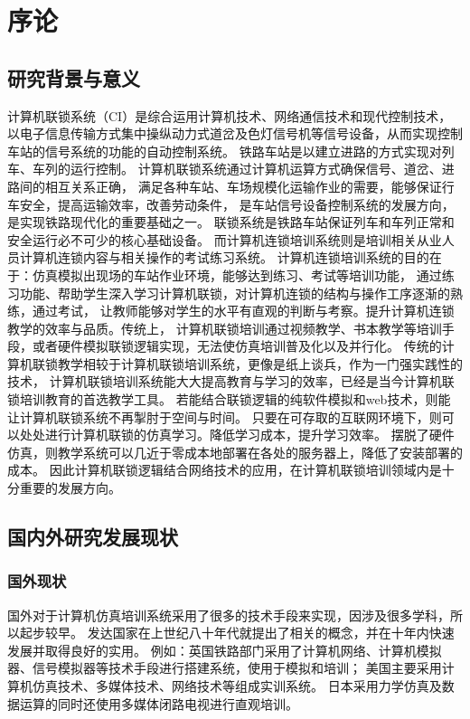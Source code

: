 \section{序论}
\subsection{研究背景与意义}
计算机联锁系统（CI）是综合运用计算机技术、网络通信技术和现代控制技术，
以电子信息传输方式集中操纵动力式道岔及色灯信号机等信号设备，从而实现控制车站的信号系统的功能的自动控制系统。
铁路车站是以建立进路的方式实现对列车、车列的运行控制。
计算机联锁系统通过计算机运算方式确保信号、道岔、进路间的相互关系正确，
满足各种车站、车场规模化运输作业的需要，能够保证行车安全，提高运输效率，改善劳动条件，
是车站信号设备控制系统的发展方向，是实现铁路现代化的重要基础之一。
联锁系统是铁路车站保证列车和车列正常和安全运行必不可少的核心基础设备。
而计算机连锁培训系统则是培训相关从业人员计算机连锁内容与相关操作的考试练习系统。
计算机连锁培训系统的目的在于：仿真模拟出现场的车站作业环境，能够达到练习、考试等培训功能，
通过练习功能、帮助学生深入学习计算机联锁，对计算机连锁的结构与操作工序逐渐的熟练，通过考试，
让教师能够对学生的水平有直观的判断与考察。提升计算机连锁教学的效率与品质。传统上，
计算机联锁培训通过视频教学、书本教学等培训手段，或者硬件模拟联锁逻辑实现，无法使仿真培训普及化以及并行化。
传统的计算机联锁教学相较于计算机联锁培训系统，更像是纸上谈兵，作为一门强实践性的技术，
计算机联锁培训系统能大大提高教育与学习的效率，已经是当今计算机联锁培训教育的首选教学工具。
若能结合联锁逻辑的纯软件模拟和web技术，则能让计算机联锁系统不再掣肘于空间与时间。
只要在可存取的互联网环境下，则可以处处进行计算机联锁的仿真学习。降低学习成本，提升学习效率。
摆脱了硬件仿真，则教学系统可以几近于零成本地部署在各处的服务器上，降低了安装部署的成本。
因此计算机联锁逻辑结合网络技术的应用，在计算机联锁培训领域内是十分重要的发展方向。

\subsection{国内外研究发展现状}
\subsubsection{国外现状}
国外对于计算机仿真培训系统采用了很多的技术手段来实现，因涉及很多学科，所以起步较早。
发达国家在上世纪八十年代就提出了相关的概念，并在十年内快速发展并取得良好的实用。
例如：英国铁路部门采用了计算机网络、计算机模拟器、信号模拟器等技术手段进行搭建系统，使用于模拟和培训；
美国主要采用计算机仿真技术、多媒体技术、网络技术等组成实训系统。
日本采用力学仿真及数据运算的同时还使用多媒体闭路电视进行直观培训。 

